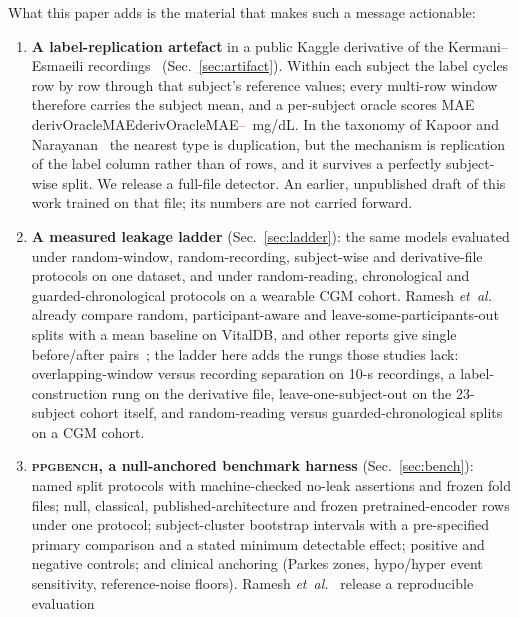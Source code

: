 \documentclass[journal]{IEEEtran}
\newcommand{\m}[1]{\ifcsname #1\endcsname\csname #1\endcsname\else\textcolor{red}{--}\fi}
\begin{document}
What this paper adds is the material that makes such a message actionable:
\begin{enumerate}
  \item \textbf{A label-replication artefact} in a public Kaggle derivative of
        the Kermani--Esmaeili recordings~\cite{kermani2023data,kaggle_ppg}
        (Sec.~\ref{sec:artifact}).  Within each subject the label cycles row
        by row through that subject's reference values; every multi-row window
        therefore carries the subject mean, and a per-subject oracle scores MAE
        \m{derivOracleMAE}~mg/dL.  In the taxonomy of Kapoor and
        Narayanan~\cite{kapoor2023leakage} the nearest type is duplication,
        but the mechanism is replication of the label column rather than of
        rows, and it survives a perfectly subject-wise split.  We release a
        full-file detector.  An earlier, unpublished draft of this work trained
        on that file; its numbers are not carried forward.
  \item \textbf{A measured leakage ladder} (Sec.~\ref{sec:ladder}): the same
        models evaluated under random-window, random-recording,
        subject-wise and derivative-file protocols on one dataset, and under
        random-reading, chronological and guarded-chronological protocols on
        a wearable CGM cohort.  Ramesh \emph{et~al.}~\cite{ramesh2026}
        already compare random, participant-aware and
        leave-some-participants-out splits with a mean baseline on VitalDB,
        and other reports give single before/after
        pairs~\cite{yoshizawa2023,mehta2024,brookshire2024}; the ladder here
        adds the rungs those studies lack: overlapping-window versus
        recording separation on 10-s recordings, a label-construction rung on
        the derivative file, leave-one-subject-out on the 23-subject cohort
        itself, and random-reading versus guarded-chronological splits on a
        CGM cohort.
  \item \textbf{\textsc{ppgbench}, a null-anchored benchmark harness}
        (Sec.~\ref{sec:bench}): named split protocols with machine-checked
        no-leak assertions and frozen fold files; null, classical,
        published-architecture and frozen pretrained-encoder rows under one
        protocol; subject-cluster bootstrap intervals with a pre-specified
        primary comparison and a stated minimum detectable effect; positive
        and negative controls; and clinical anchoring (Parkes zones,
        hypo/hyper event sensitivity, reference-noise floors).  Ramesh
        \emph{et~al.}~\cite{ramesh2026} release a reproducible evaluation

\end{enumerate}
\end{document}
